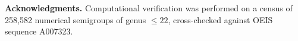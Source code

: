 \documentclass[11pt]{amsart}
\theoremstyle{definition}
\theoremstyle{remark}
\begin{document}
\bigskip
\noindent\textbf{Acknowledgments.}
Computational verification was performed on a census of 258{,}582
numerical semigroups of genus $\le 22$, cross-checked against OEIS
sequence A007323.




\end{document}
